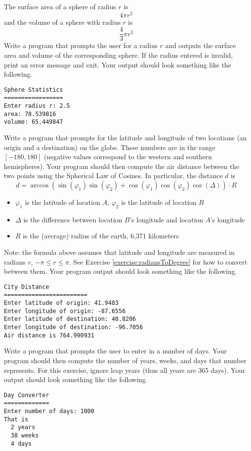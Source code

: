 \begin{exer}
The surface area of a sphere of radius $r$ is
  $$4\pi r^2$$
and the volume of a sphere with radius $r$ is 
  $$\frac{4}{3}\pi r^3$$
Write a program that prompts the user for a radius $r$ and outputs the surface area and volume of 
the corresponding sphere.  If the radius entered is invalid, print an error message and exit.  Your
output should look something like the following.

\begin{verbatim}
Sphere Statistics
=================
Enter radius r: 2.5
area: 78.539816
volume: 65.449847
\end{verbatim}
\end{exer}

\begin{exer}
Write a program that prompts for the latitude and longitude of two locations (an origin and a 
destination) on the globe.  These numbers are in the range $[-180, 180]$ (negative values 
correspond to the western and southern hemispheres).  Your program should then compute 
the air distance between the two points using the Spherical Law of Cosines.  In particular, 
the distance $d$ is
 $$d = \arccos{(\sin(\varphi_1) \sin(\varphi_2) + \cos(\varphi_1) \cos(\varphi_2) \cos(\Delta) )} \cdot R$$
\begin{itemize}
  \item $\varphi_1$ is the latitude of location $A$, $\varphi_2$ is the latitude of location $B$
  \item $\Delta$ is the difference between location $B$'s longitude and location $A$'s longitude
  \item $R$ is the (average) radius of the earth, 6,371 kilometers
\end{itemize}
Note: the formula above assumes that latitude and longitude are measured in radians $r$, $-\pi \leq r \leq \pi$.  
See Exercise \ref{exercise:radiansToDegree} for how to convert between them.  Your program output should 
look something like the following.  

\begin{verbatim}
City Distance
========================
Enter latitude of origin: 41.9483
Enter longitude of origin: -87.6556
Enter latitude of destination: 40.8206
Enter longitude of destination: -96.7056
Air distance is 764.990931
\end{verbatim}

\end{exer}

\begin{exer}
Write a program that prompts the user to enter in a number of days.  Your program should
then compute the number of years, weeks, and days that number represents.  For this 
exercise, ignore leap years (thus all years are 365 days). Your output should look something 
like the following.

\begin{verbatim}
Day Converter
=============
Enter number of days: 1000
That is 
  2 years
  38 weeks
  4 days
\end{verbatim}
\end{exer}

